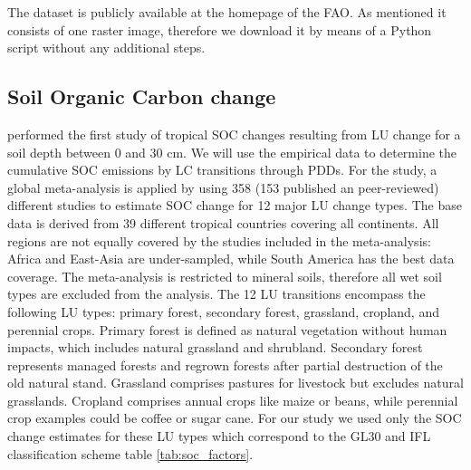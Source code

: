 		The dataset is publicly available at the homepage of the \ac{FAO}. As mentioned it consists of one raster image, therefore we download it by means of a Python script without any additional steps.

	\subsection{Soil Organic Carbon change}
	\label{subsec:methods_socc}
		\citet{Don2010} performed the first study of tropical \ac{SOC} changes resulting from \ac{LU} change for a soil depth between 0 and 30 cm. We will use the empirical data to determine the cumulative \ac{SOC} emissions by \ac{LC} transitions through \acp{PDD}. For the study, a global meta-analysis is applied by using 358 (153 published an peer-reviewed) different studies to estimate \ac{SOC} change for 12 major \ac{LU} change types. The base data is derived from 39 different tropical countries covering all continents. All regions are not equally covered by the studies included in the meta-analysis: Africa and East-Asia are under-sampled, while South America has the best data coverage. The meta-analysis is restricted to mineral soils, therefore all wet soil types are excluded from the analysis. The 12 \ac{LU} transitions encompass the following \ac{LU} types: primary forest, secondary forest, grassland, cropland, and perennial crops. Primary forest is defined as natural vegetation without human impacts, which includes natural grassland and shrubland. Secondary forest represents managed forests and regrown forests after partial destruction of the old natural stand. Grassland comprises pastures for livestock but excludes natural grasslands. Cropland comprises annual crops like maize or beans, while perennial crop examples could be coffee or sugar cane. For our study we used only the \ac{SOC} change estimates for these \ac{LU} types which correspond to the \ac{GL30} and \ac{IFL} classification scheme table \ref{tab:soc_factors}.
